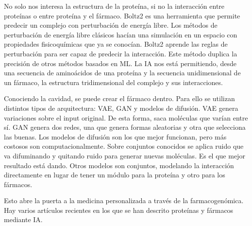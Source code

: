 No solo nos interesa la estructura de la proteína, si no la interacción entre proteínas o entre proteína y el fármaco. Boltz2 es una herramienta que permite predecir un complejo con perturbación de energía libre. Los métodos de perturbación de energía libre clásicos hacían una simulación en un espacio con propiedades fisicoquímicas que ya se conocían. Boltz2 aprende las reglas de perturbación para ser capaz de predecir la interacción. Este método duplica la precisión de otros métodos basados en ML. La IA nos está permitiendo, desde una secuencia de aminoácidos de una proteína y la secuencia unidimensional de un fármaco, la estructura tridimensional del complejo y sus interacciones. 

Conociendo la cavidad, se puede crear el fármaco dentro. Para ello se utilizan distintos tipos de arquitectura: VAE, GAN y modelos de difusión. VAE genera variaciones sobre el input original. De esta forma, saca moléculas que varían entre sí. GAN genera dos redes, una que genera formas aleatorias y otra que selecciona las buenas. Los modelos de difusión son los que mejor funcionan, pero más costosos son computacionalmente. Sobre conjuntos conocidos se aplica ruido que va difuminando y quitando ruido para generar nuevas moléculas. Es el que mejor resultado está dando. Otros modelos son conjuntos, modelando la interacción directamente en lugar de tener un módulo para la proteína y otro para los fármacos.

Esto abre la puerta a la medicina personalizada a través de la farmacogenómica. Hay varios artículos recientes en los que se han descrito proteínas y fármacos mediante IA. 


